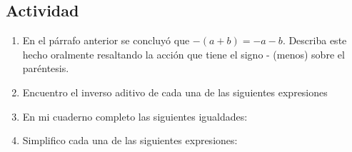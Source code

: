 \documentclass[10pt,twoside]{article}
\begin{document}
\subsection{Actividad}
\begin{enumerate}
  \item En el párrafo anterior se concluyó que $- (a + b) = - a - b$. Describa este hecho oralmente resaltando la acción que tiene el signo - (menos) sobre el paréntesis.
  \item Encuentro el inverso aditivo de cada una de las siguientes expresiones
\begin{enumerate}
 \end{enumerate}
  \item En mi cuaderno completo las siguientes igualdades:
  \begin{enumerate}
  \end{enumerate}
  \item Simplifico cada una de las siguientes expresiones:
\begin{enumerate}
\end{enumerate}
\end{enumerate}
\end{document}
